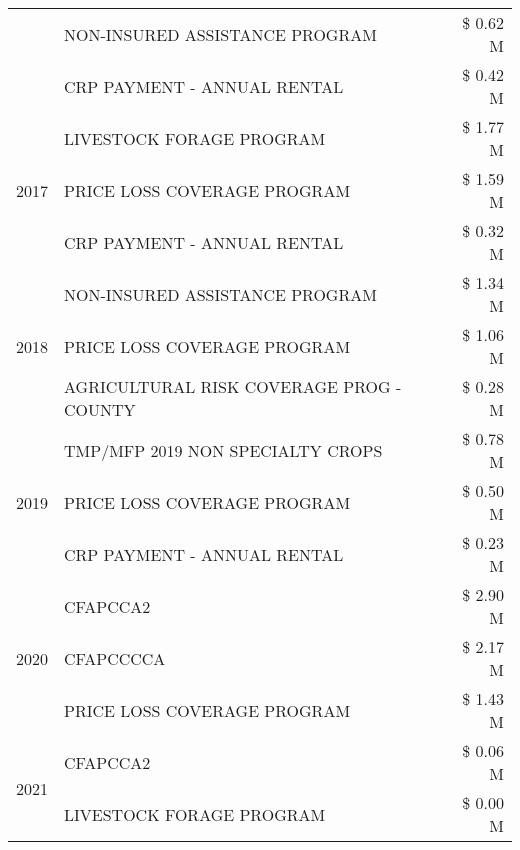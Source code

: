 \begin{tabular}{llr}
 & NON-INSURED ASSISTANCE PROGRAM & \$ 0.62 M \\
 & CRP PAYMENT - ANNUAL RENTAL & \$ 0.42 M \\
\cline{1-3}
\multirow[t]{3}{*}{2017} & LIVESTOCK FORAGE PROGRAM & \$ 1.77 M \\
 & PRICE LOSS COVERAGE PROGRAM & \$ 1.59 M \\
 & CRP PAYMENT - ANNUAL RENTAL & \$ 0.32 M \\
\cline{1-3}
\multirow[t]{3}{*}{2018} & NON-INSURED ASSISTANCE PROGRAM & \$ 1.34 M \\
 & PRICE LOSS COVERAGE PROGRAM & \$ 1.06 M \\
 & AGRICULTURAL RISK COVERAGE PROG - COUNTY & \$ 0.28 M \\
\cline{1-3}
\multirow[t]{3}{*}{2019} & TMP/MFP 2019 NON SPECIALTY CROPS & \$ 0.78 M \\
 & PRICE LOSS COVERAGE PROGRAM & \$ 0.50 M \\
 & CRP PAYMENT - ANNUAL RENTAL & \$ 0.23 M \\
\cline{1-3}
\multirow[t]{3}{*}{2020} & CFAPCCA2 & \$ 2.90 M \\
 & CFAPCCCCA & \$ 2.17 M \\
 & PRICE LOSS COVERAGE PROGRAM & \$ 1.43 M \\
\cline{1-3}
\multirow[t]{2}{*}{2021} & CFAPCCA2 & \$ 0.06 M \\
 & LIVESTOCK FORAGE PROGRAM & \$ 0.00 M \\
\cline{1-3}
\bottomrule
\end{tabular}
